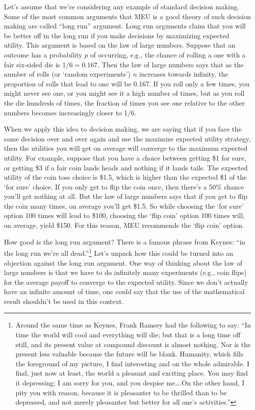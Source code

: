 \documentclass[]{tufte-book}
\begin{document}
Let's assume that we're considering any example of standard decision making. Some of the most common arguments that MEU is a good theory of such decision making are called ``long run'' argument. Long run arguments claim that you will be better off in the long run if you make decisions by maximizing expected utility. This argument is based on the law of large numbers. Suppose that an outcome has a probability \(p\) of occurring, e.g., the chance of rolling a one with a fair six-sided die is \(1/6=0.167\). Then the law of large numbers says that as the number of rolls (or `random experiments') \(n\) increases towards infinity, the proportion of rolls that lead to one will be 0.167. If you roll only a few times, you might never see one, or you might see it a high number of times, but as you roll the die hundreds of times, the fraction of times you see one relative to the other numbers becomes increasingly closer to 1/6.

When we apply this idea to decision making, we are saying that if you face the same decision over and over again and use the maximize expected utility strategy, then the utilities you will get on average will converge to the maximum expected utility. For example, suppose that you have a choice between getting \$1 for sure, or getting \$3 if a fair coin lands heads and nothing if it lands tails. The expected utility of the coin toss choice is \$1.5, which is higher than the expected \$1 of the `for sure' choice. If you only get to flip the coin once, then there's a 50\% chance you'll get nothing at all. But the law of large numbers says that if you get to flip the coin many times, on average you'll get \$1.5. So while choosing the `for sure' option 100 times will lead to \$100, choosing the `flip coin' option 100 times will, on average, yield \$150. For this reason, MEU recommends the `flip coin' option.

How good is the long run argument? There is a famous phrase from Keynes: ``in the long run we're all dead.''\footnote{Around the same time as Keynes, Frank Ramsey had the following to say: ``In time the world will cool and everything will die; but that is a long time off still, and its present value at compound discount is almost nothing. Nor is the present less valuable because the future will be blank. Humanity, which fills the foreground of my picture, I find interesting and on the whole admirable. I find, just now at least, the world a pleasant and exciting place. You may find it depressing; I am sorry for you, and you despise me\ldots.On the other hand, I pity you with reason, because it is pleasanter to be thrilled than to be depressed, and not merely pleasanter but better for all one's activities.''} Let's unpack how this could be turned into an objection against the long run argument. One way of thinking about the law of large numbers is that we have to do infinitely many experiments (e.g., coin flips) for the average payoff to converge to the expected utility. Since we don't actually have an infinite amount of time, one could say that the use of the mathematical result shouldn't be used in this context.
\end{document}
